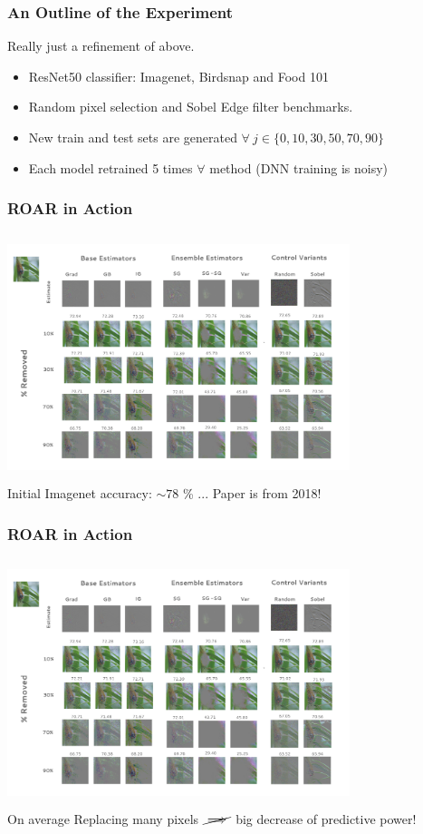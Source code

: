\documentclass{beamer}
\theoremstyle{mystyle}
\begin{document}
\begin{frame}
	\frametitle{An Outline of the Experiment}
	Really just a refinement of above.
	\begin{itemize}
		\item ResNet50 classifier: Imagenet, Birdsnap and Food 101\pause
		\item Random pixel selection and Sobel Edge filter benchmarks.\pause
		\item  New train and test sets are generated  $\forall  \ j \in \{0,10,30,50,70,90\} $\pause
		\item Each model retrained 5 times $\forall $ method (DNN training is noisy) \pause
	\end{itemize}
\end{frame}

\begin{frame}
	\frametitle{ROAR in Action}
	\includegraphics[height=7.2cm, width=10cm]{ROAR_methods.png}\\ \pause
	Initial Imagenet accuracy: $\sim78$ \% ... \pause Paper is from 2018!
\end{frame}

\begin{frame}
	\frametitle{ROAR in Action}
	\includegraphics[height=7.2cm, width=10cm]{ROAR_methods.png}\\
	On average Replacing many pixels $\cancel{\implies}$ big decrease of predictive power! \pause

\end{frame}
\end{document}
